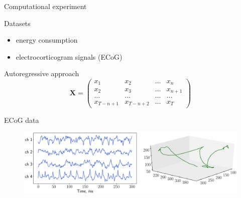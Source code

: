 \documentclass[9pt]{beamer}
\begin{document}
\begin{frame}{Computational experiment}
\begin{minipage}{0.55\textwidth}
	\begin{block}{Datasets}
		\vspace{0.35cm}
		\begin{itemize}
			\item energy consumption
			\item electrocorticogram signals (ECoG)
		\end{itemize}
	\end{block}
	\vspace{0.5cm}
\end{minipage}%
\begin{minipage}{0.45\textwidth}
	\begin{block}{Autoregressive approach}
		\[
		\mathbf{X} = 
		\begin{pmatrix}
		x_1 & x_2 & \dots & x_n \\
		x_2 & x_3 & \dots & x_{n+1} \\
		\dots & \dots & \dots & \dots \\
		x_{T-n+1} & x_{T-n+2} & \dots & x_T
		\end{pmatrix}
		\]
	\end{block}
\end{minipage}
\begin{block}{ECoG data}
	\begin{figure}
		\includegraphics[width=\linewidth]{figs/ecog_data}
	\end{figure}
\end{block}
\end{frame}
\end{document}
